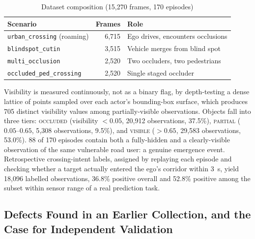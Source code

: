 \documentclass[conference]{IEEEtran}
\begin{document}
\begin{table}[htbp]
\caption{Dataset composition (15{,}270 frames, 170 episodes)}
\label{tab:dataset}
\centering
\begin{tabular}{@{}lrl@{}}
\toprule
Scenario & Frames & Role \\
\midrule
\texttt{urban\_crossing} (roaming) & 6{,}715 & Ego drives, encounters occlusions \\
\texttt{blindspot\_cutin} & 3{,}515 & Vehicle merges from blind spot \\
\texttt{multi\_occlusion} & 2{,}520 & Two occluders, two pedestrians \\
\texttt{occluded\_ped\_crossing} & 2{,}520 & Single staged occluder \\
\bottomrule
\end{tabular}
\end{table}

Visibility is measured continuously, not as a binary flag, by
depth-testing a dense lattice of points sampled over each actor's
bounding-box surface, which produces 705 distinct visibility values
among partially-visible observations. Objects fall into three tiers:
\textsc{occluded} (visibility $<0.05$, 20{,}912 observations, 37.5\%),
\textsc{partial} ($0.05$--$0.65$, 5{,}308 observations, 9.5\%), and
\textsc{visible} ($>0.65$, 29{,}583 observations, 53.0\%). 88 of 170
episodes contain both a fully-hidden and a clearly-visible observation
of the same vulnerable road user: a genuine emergence event.
Retrospective crossing-intent labels, assigned by replaying each
episode and checking whether a target actually entered the ego's
corridor within 3~s, yield 18{,}096 labelled observations, 36.8\%
positive overall and 52.8\% positive among the subset within sensor
range of a real prediction task.

\subsection{Defects Found in an Earlier Collection, and the Case for Independent Validation}
\end{document}
